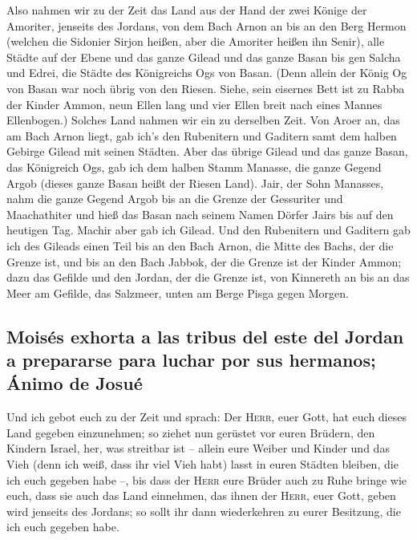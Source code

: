  Also nahmen wir zu der Zeit das Land aus der Hand der
zwei Könige der Amoriter, jenseits des Jordans, von dem Bach Arnon an
bis an den Berg Hermon  (welchen die Sidonier Sirjon
heißen, aber die Amoriter heißen ihn Senir),  alle Städte
auf der Ebene und das ganze Gilead und das ganze Basan bis gen Salcha
und Edrei, die Städte des Königreichs Ogs von Basan. 
(Denn allein der König Og von Basan war noch übrig von den Riesen.
Siehe, sein eisernes Bett ist zu Rabba der Kinder Ammon, neun Ellen lang
und vier Ellen breit nach eines Mannes Ellenbogen.) 
Solches Land nahmen wir ein zu derselben Zeit. Von Aroer an, das am Bach
Arnon liegt, gab ich's den Rubenitern und Gaditern samt dem halben
Gebirge Gilead mit seinen Städten.  Aber das übrige
Gilead und das ganze Basan, das Königreich Ogs, gab ich dem halben Stamm
Manasse, die ganze Gegend Argob (dieses ganze Basan heißt der Riesen
Land).  Jair, der Sohn Manasses, nahm die ganze Gegend
Argob bis an die Grenze der Gessuriter und Maachathiter und hieß das
Basan nach seinem Namen Dörfer Jairs bis auf den heutigen Tag.
 Machir aber gab ich Gilead.  Und den
Rubenitern und Gaditern gab ich des Gileads einen Teil bis an den Bach
Arnon, die Mitte des Bachs, der die Grenze ist, und bis an den Bach
Jabbok, der die Grenze ist der Kinder Ammon;  dazu das
Gefilde und den Jordan, der die Grenze ist, von Kinnereth an bis an das
Meer am Gefilde, das Salzmeer, unten am Berge Pisga gegen Morgen.

\hypertarget{moisuxe9s-exhorta-a-las-tribus-del-este-del-jordan-a-prepararse-para-luchar-por-sus-hermanos-uxe1nimo-de-josuuxe9}{%
\subsection{Moisés exhorta a las tribus del este del Jordan a prepararse
para luchar por sus hermanos; Ánimo de
Josué}\label{moisuxe9s-exhorta-a-las-tribus-del-este-del-jordan-a-prepararse-para-luchar-por-sus-hermanos-uxe1nimo-de-josuuxe9}}

 Und ich gebot euch zu der Zeit und sprach: Der
\textsc{Herr}, euer Gott, hat euch dieses Land gegeben einzunehmen; so
ziehet nun gerüstet vor euren Brüdern, den Kindern Israel, her, was
streitbar ist --  allein eure Weiber und Kinder und das
Vieh (denn ich weiß, dass ihr viel Vieh habt) lasst in euren Städten
bleiben, die ich euch gegeben habe --,  bis dass der
\textsc{Herr} eure Brüder auch zu Ruhe bringe wie euch, dass sie auch
das Land einnehmen, das ihnen der \textsc{Herr}, euer Gott, geben wird
jenseits des Jordans; so sollt ihr dann wiederkehren zu eurer Besitzung,
die ich euch gegeben habe.

